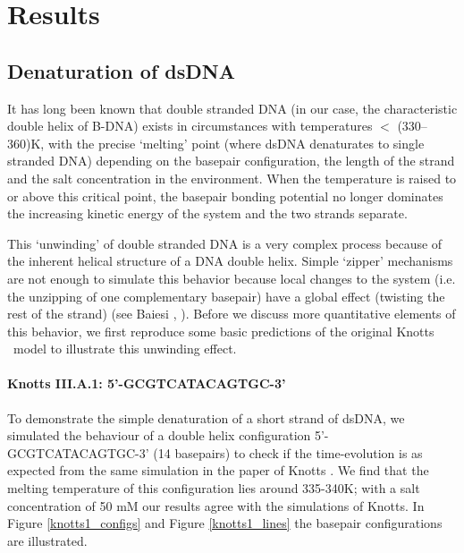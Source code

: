 \section{Results}

\subsection{Denaturation of dsDNA}

It has long been known that double stranded DNA (in our case, the characteristic double helix of B-DNA) exists in circumstances with temperatures $<$ (330--360)K, with the precise `melting' point (where dsDNA denaturates to single stranded DNA) depending on the basepair configuration, the length of the strand and the salt concentration in the environment. When the temperature is raised to or above this critical point, the basepair bonding potential no longer dominates the increasing kinetic energy of the system and the two strands separate. 

This `unwinding' of double stranded DNA is a very complex process because of the inherent helical structure of a DNA double helix. Simple `zipper' mechanisms are not enough to simulate this behavior because local changes to the system (i.e. the unzipping of one complementary basepair) have a global effect (twisting the rest of the strand) (see Baiesi \etal, \cite{carlon2010unwinding}). Before we discuss more quantitative elements of this behavior, we first reproduce some basic predictions of the original Knotts \etal\ model \cite{knotts2007coarse} to illustrate this unwinding effect.

\paragraph{Knotts III.A.1: 5'-GCGTCATACAGTGC-3'} To demonstrate the simple denaturation of a short strand of dsDNA, we simulated the behaviour of a double helix configuration 5'-GCGTCATACAGTGC-3' (14 basepairs) to check if the time-evolution is as expected from the same simulation in the paper of Knotts \etal \cite{knotts2007coarse}. We find that the melting temperature of this configuration lies around 335-340K; with a salt concentration of 50 mM our results agree with the simulations of Knotts. In Figure \ref{knotts1_configs} and Figure \ref{knotts1_lines} the basepair configurations are illustrated.

